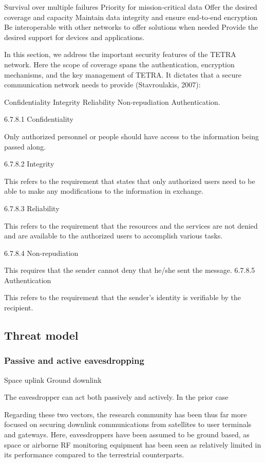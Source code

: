 \documentclass[english, 12pt, a4paper, elec, utf8, a-1b, online]{aaltothesis}
\begin{document}
    Survival over multiple failures
    Priority for mission‐critical data
    Offer the desired coverage and capacity
    Maintain data integrity and ensure end‐to‐end encryption
    Be interoperable with other networks to offer solutions when needed
    Provide the desired support for devices and applications.




In this section, we address the important security features of the TETRA network.
Here the scope of coverage spans the authentication, encryption mechanisms, and the key management of TETRA.
It dictates that a secure communication network needs to provide (Stavroulakis, 2007):

    Confidentiality
    Integrity
    Reliability
    Non‐repudiation
    Authentication.

6.7.8.1 Confidentiality

    Only authorized personnel or people should have access to the information being passed along.

6.7.8.2 Integrity

    This refers to the requirement that states that only authorized users need to be able to make any modifications to the information in exchange.

6.7.8.3 Reliability

    This refers to the requirement that the resources and the services are not denied and are available to the authorized users to accomplish various tasks.

6.7.8.4 Non‐repudiation

This requires that the sender cannot deny that he/she sent the message.
6.7.8.5 Authentication

    This refers to the requirement that the sender's identity is verifiable by the recipient.

\subsection{Threat model}
\subsubsection{Passive and active eavesdropping}
Space uplink
Ground downlink

The eavesdropper can act both passively and actively.
In the prior case 

Regarding these two vectors, the research community has been thus far more focused on securing downlink communications from satellites to user terminals and gateways.
Here, eavesdroppers have been assumed to be ground based, as space or airborne RF monitoring equipment has been seen as relatively limited in its performance compared to the terrestrial counterparts.
\end{document}
